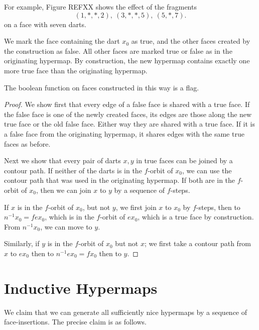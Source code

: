 For example, Figure REFXX shows the effect of the fragments
$$(1,*,*,2),\ (3,*,*,5),\ (5,*,7).
  $$ on a face with seven darts.


We mark the face containing the dart $x_0$ as true, and the other
faces created by the construction as false.   All other faces are
marked true or false as in the originating hypermap.  By
construction, the new hypermap contains exactly one more true face
than the originating hypermap.

\begin{lemma} The boolean function on faces constructed in this way is a
flag.
\end{lemma}

\begin{proof}  We show first that every edge of a false face is shared
with a true face.  If the false face is one of the newly created
faces, its edges are those along the new true face or the old false
face. Either way they are shared with a true face.   If it is a
false face from the originating hypermap, it shares edges with the
same true faces as before.

Next we show that every pair of darts $x,y$ in true faces can be
joined by a contour path.  If neither of the darts is in the
$f$-orbit of $x_0$, we can use the contour path that was used in the
originating hypermap.  If both are in the $f$-orbit of $x_0$, then
we can join $x$ to $y$ by a sequence of $f$-steps.

If $x$ is in the $f$-orbit of $x_0$, but not $y$, we first join $x$
to $x_0$ by $f$-steps, then to $n^{-1} x_0 = f e x_0$, which is in
the $f$-orbit of $e x_0$, which is a true face by construction.
From $n^{-1} x_0$, we can move to $y$.

Similarly, if $y$ is in the $f$-orbit of $x_0$ but not $x$; we first
take a contour path from $x$ to $e x_0$ then to $n^{-1} e x_0 = f
x_0$ then to $y$.
\end{proof}

\section{Inductive Hypermaps}

We claim that we can generate all sufficiently nice hypermaps by a
sequence of face-insertions.  The precise claim is as follows.

